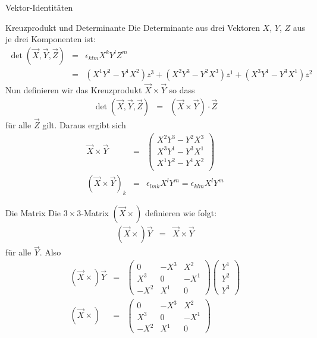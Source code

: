 \begin{chapter}{\titlestr}
\begin{appendix}
\begin{section}{Vektor-Identitäten}
\begin{subsection}{Kreuzprodukt und Determinante}
Die Determinante aus drei Vektoren $X$, $Y$, $Z$ aus je drei Komponenten ist:
\begin{eqnarray*}
\det(\vec{X},\vec{Y},\vec{Z}) &=& \epsilon_{klm}X^kY^lZ^m\\
&=&(X^1Y^2-Y^1X^2)z^3+(X^2Y^3-Y^2X^3)z^1+(X^3Y^1-Y^3X^1)z^2
\end{eqnarray*}
Nun definieren wir das Kreuzprodukt $\vec{X}\times\vec{Y}$ so dass
\begin{eqnarray*}
\det(\vec{X},\vec{Y},\vec{Z}) &=& \left(\vec{X}\times\vec{Y}\right)\cdot\vec{Z}
\end{eqnarray*}
für alle $\vec{Z}$ gilt. Daraus ergibt sich
\begin{eqnarray*}
\vec{X}\times\vec{Y}&=&\begin{pmatrix}
X^2Y^3-Y^2X^3\\
X^3Y^1-Y^3X^1\\
X^1Y^2-Y^1X^2\\
\end{pmatrix}\\
\left(\vec{X}\times\vec{Y}\right)_k &=& \epsilon_{lmk}X^lY^m=\epsilon_{klm}X^lY^m
\end{eqnarray*}
\end{subsection}

\begin{subsection}{Die Matrix }
Die $3\times 3$-Matrix $\left(\vec{X}\times\right)$ definieren wie folgt:
\begin{eqnarray*}
\left(\vec{X}\times\right)\vec{Y} &=& \vec{X}\times\vec{Y}
\end{eqnarray*}
für alle $\vec{Y}$. Also
\begin{eqnarray*}
\left(\vec{X}\times\right)\vec{Y} &=& \begin{pmatrix}
0 & -X^3 & X^2\\
X^3 & 0 & -X^1\\
-X^2 & X^1 & 0
\end{pmatrix}
\begin{pmatrix}
Y^1\\
Y^2\\
Y^3
\end{pmatrix}\\
\left(\vec{X}\times\right) &=& \begin{pmatrix}
0 & -X^3 & X^2\\
X^3 & 0 & -X^1\\
-X^2 & X^1 & 0
\end{pmatrix}
\end{eqnarray*}
\end{subsection}


\end{section}
\end{appendix}
\end{chapter}
